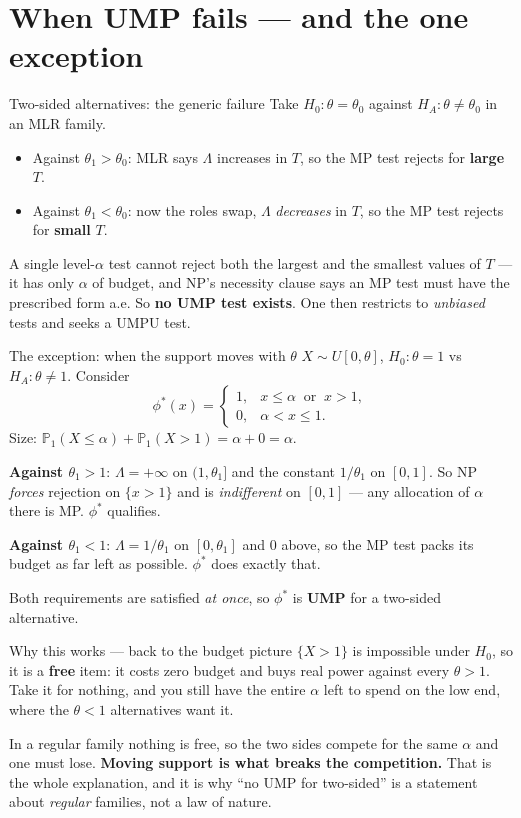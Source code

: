 \documentclass[11pt]{article}
\newcommand{\Prob}{\mathbb{P}}
\begin{document}
\section{When UMP fails --- and the one exception}

\begin{idea}{Two-sided alternatives: the generic failure}
Take $H_0:\theta=\theta_0$ against $H_A:\theta\ne\theta_0$ in an MLR family.
\begin{itemize}
\item Against $\theta_1>\theta_0$: MLR says $\Lambda$ increases in $T$, so the MP test rejects
for \textbf{large} $T$.
\item Against $\theta_1<\theta_0$: now the roles swap, $\Lambda$ \emph{decreases} in $T$, so
the MP test rejects for \textbf{small} $T$.
\end{itemize}
A single level-$\alpha$ test cannot reject both the largest and the smallest values of $T$ ---
it has only $\alpha$ of budget, and NP's necessity clause says an MP test must have the
prescribed form a.e. So \textbf{no UMP test exists}. One then restricts to \emph{unbiased}
tests and seeks a UMPU test.
\end{idea}

\begin{idea}{The exception: when the support moves with $\theta$}
$X\sim U[0,\theta]$, $H_0:\theta=1$ vs $H_A:\theta\ne1$. Consider
\[
\phi^*(x)=\begin{cases}1,& x\le\alpha\ \text{ or }\ x>1,\\ 0,&\alpha<x\le1.\end{cases}
\]
Size: $\Prob_{1}(X\le\alpha)+\Prob_{1}(X>1)=\alpha+0=\alpha$. \checkmark

\smallskip
\textbf{Against $\theta_1>1$}: $\Lambda=+\infty$ on $(1,\theta_1]$ and the constant
$1/\theta_1$ on $[0,1]$. So NP \emph{forces} rejection on $\{x>1\}$ and is \emph{indifferent}
on $[0,1]$ --- any allocation of $\alpha$ there is MP. $\phi^*$ qualifies.

\textbf{Against $\theta_1<1$}: $\Lambda=1/\theta_1$ on $[0,\theta_1]$ and $0$ above, so the MP
test packs its budget as far left as possible. $\phi^*$ does exactly that.

Both requirements are satisfied \emph{at once}, so $\phi^*$ is \textbf{UMP} for a two-sided
alternative.
\end{idea}

\begin{idea}{Why this works --- back to the budget picture}
$\{X>1\}$ is impossible under $H_0$, so it is a \textbf{free} item: it costs zero budget and
buys real power against every $\theta>1$. Take it for nothing, and you still have the entire
$\alpha$ left to spend on the low end, where the $\theta<1$ alternatives want it.

In a regular family nothing is free, so the two sides compete for the same $\alpha$ and one
must lose. \textbf{Moving support is what breaks the competition.} That is the whole
explanation, and it is why ``no UMP for two-sided'' is a statement about \emph{regular}
families, not a law of nature.
\end{idea}
\end{document}
